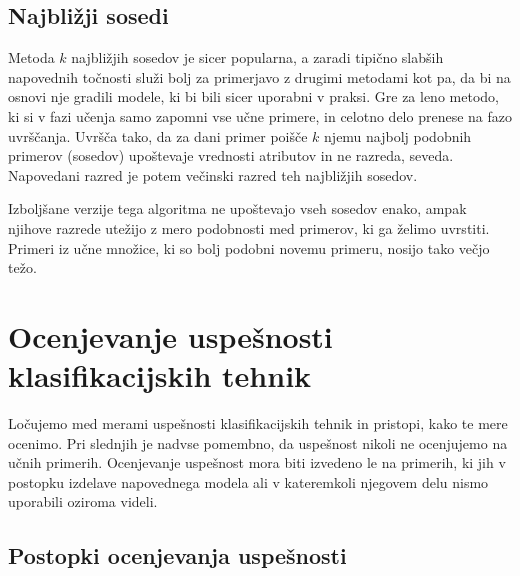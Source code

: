 \subsection{Najbližji sosedi}

Metoda $k$ najbližjih sosedov je sicer popularna, a zaradi tipično slabših napovednih točnosti služi bolj za primerjavo z drugimi metodami kot pa, da bi na osnovi nje gradili modele, ki bi bili sicer uporabni v praksi. Gre za leno metodo, ki si v fazi učenja samo zapomni vse učne primere, in celotno delo prenese na fazo uvrščanja. Uvršča tako, da za dani primer poišče $k$ njemu najbolj podobnih primerov (sosedov) upoštevaje vrednosti atributov in ne razreda, seveda. Napovedani razred je potem večinski razred teh najbližjih sosedov.

Izboljšane verzije tega algoritma ne upoštevajo vseh sosedov enako, ampak njihove razrede utežijo z mero podobnosti med primerov, ki ga želimo uvrstiti. Primeri iz učne množice, ki so bolj podobni novemu primeru, nosijo tako večjo težo.

\section{Ocenjevanje uspešnosti klasifikacijskih tehnik}

Ločujemo med merami uspešnosti klasifikacijskih tehnik in pristopi, kako te mere ocenimo. Pri slednjih je nadvse pomembno, da uspešnost nikoli ne ocenjujemo na učnih primerih. Ocenjevanje uspešnost mora biti izvedeno le na primerih, ki jih v postopku izdelave napovednega modela ali v kateremkoli njegovem delu nismo uporabili oziroma videli.

\subsection{Postopki ocenjevanja uspešnosti}

